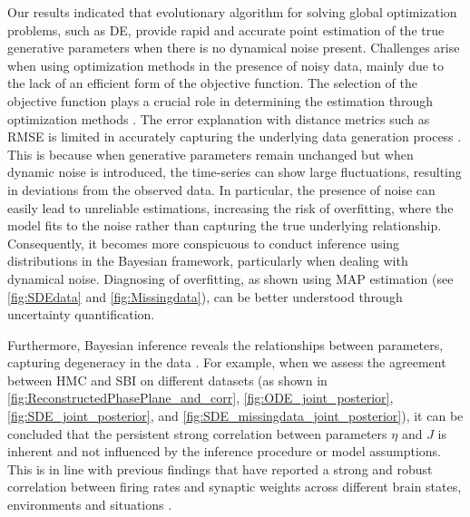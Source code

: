 \documentclass[preprint,11pt,authoryear]{elsarticle}
\begin{document}
Our results indicated that evolutionary algorithm for solving global optimization problems, such as DE, provide rapid and accurate point estimation of the true generative parameters when there is no dynamical noise present.
Challenges arise when using optimization methods in the presence of noisy data, mainly due to the lack of an efficient form of the objective function. The selection of the objective function plays a crucial role in determining the estimation through optimization methods \citep{Hashemi2018, Svensson2012}. The error explanation with distance metrics such as RMSE is limited in accurately capturing the underlying data generation process \citep{Baldy2023}. This is because when generative parameters remain unchanged but when dynamic noise is introduced, the time-series can show large fluctuations, resulting in deviations from the observed data. In particular, the presence of noise can easily lead to unreliable estimations, increasing the risk of overfitting, where the model fits to the noise rather than capturing the true underlying relationship. Consequently, it becomes more conspicuous to conduct inference using distributions in the Bayesian framework, particularly when dealing with dynamical noise.  Diagnosing of overfitting, as shown using MAP estimation (see \autoref{fig:SDEdata} and \autoref{fig:Missingdata}), can be better understood through uncertainty quantification. 


Furthermore, Bayesian inference reveals the relationships between parameters, capturing degeneracy in the data \citep{Edelman2001, Hashemi2023}. For example, when we assess the agreement between HMC and SBI on different datasets (as shown in \autoref{fig:ReconstructedPhasePlane_and_corr}, \autoref{fig:ODE_joint_posterior}, \autoref{fig:SDE_joint_posterior}, and \autoref{fig:SDE_missingdata_joint_posterior}), it can be concluded that the persistent strong correlation between parameters $\eta$ and $J$ is inherent and not influenced by the inference procedure or model assumptions. This is in line with previous findings that have reported a strong and robust correlation between firing rates and synaptic weights across different brain states, environments and situations \citep{Buzsaki2014}. 
\end{document}
